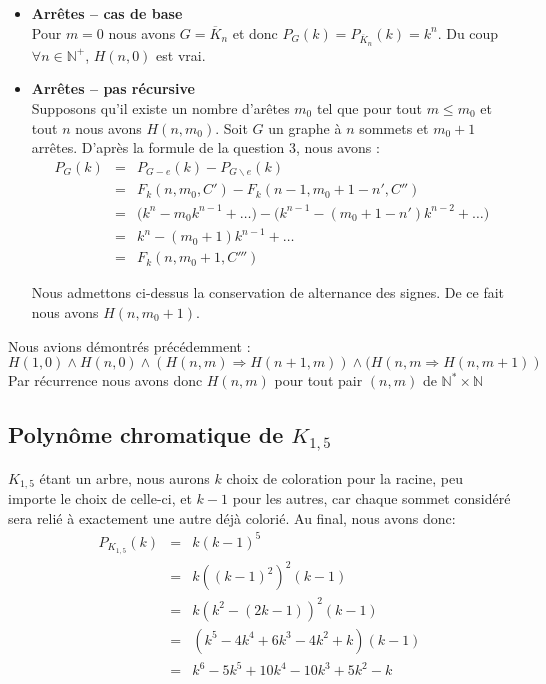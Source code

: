 \begin{itemize}
\item \textbf{Arrêtes -- cas de base} \\
Pour $m = 0$ nous avons $G = \overline{K}_n$ et donc $P_G(k) = P_{\overline{K}_n}(k) = k^n$. Du coup $\forall n \in \mathbb{N^+}$, $H(n,0)$ est vrai.

\item \textbf{Arrêtes -- pas récursive} \\
Supposons qu'il existe un nombre d'arêtes $m_0$ tel que pour tout $m \leq m_0$ et tout $n$ nous avons $H(n,m_0)$. Soit $G$ un graphe à $n$ sommets et $m_0 + 1$ arrêtes. D'après la formule de la question 3, nous avons :
\begin{eqnarray*}
P_G(k) &=& P_{G-e}(k) - P_{G \backslash e}(k)	\\
		&=& F_k(n,m_0,C') - F_k(n-1,m_0+1-n',C'')	\\
		&=& \Big( k^n - m_0k^{n-1} + \ldots \Big) - \Big( k^{n-1} - (m_0+1-n')k^{n-2} + \ldots \Big) 	\\
		&=& k^n - (m_0+1)k^{n-1} + \ldots	\\
		&=& F_k(n, m_0+1, C''')									
\end{eqnarray*}

Nous admettons ci-dessus la conservation de alternance des signes. De ce fait nous avons $H(n,m_0+1)$.
\end {itemize}
Nous avions démontrés précédemment :
\[ H(1,0) \wedge H(n,0) \wedge (H(n,m) \Rightarrow H(n+1,m)) \wedge (H(n,m \Rightarrow H(n,m+1)) \]
Par récurrence nous avons donc $H(n,m)$ pour tout pair $(n,m)$ de $\mathbb{N}^*\times{\mathbb{N}}$

\subsection{Polynôme chromatique de $K_{1,5}$}
$K_{1,5}$ étant un arbre, nous aurons $k$ choix de coloration pour la racine, peu importe le choix de celle-ci, et $k-1$ pour les autres, car chaque sommet considéré sera relié à exactement une autre déjà colorié. Au final, nous avons donc:
\begin{eqnarray*}
P_{K_{1,5}}(k) 	& = & k(k-1)^5 \\
				& = & k{((k-1)^2)}^2(k-1)	\\
				& = & k(k^2 - (2k - 1))^2(k-1)	\\
				& = & (k^5 - 4k^4  + 6k^3 - 4k^2 + k)(k-1)  \\
				& = & k^6 - 5k^5  + 10k^4 - 10k^3 + 5k^2 - k	 
\end{eqnarray*}

